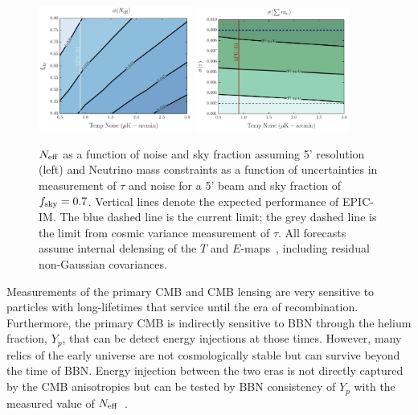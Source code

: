 \begin{figure}[t!]
\begin{center}
\includegraphics[width=0.45\textwidth]{figs/Neff.pdf}
\includegraphics[width=0.45\textwidth]{figs/Mnu_tauprior.pdf}
\caption{ \small \setlength{\baselineskip}{0.95\baselineskip}
${N_{\rm eff}}$ as a function of noise and sky fraction assuming 5' resolution (left) and
Neutrino mass constraints as a function of uncertainties in measurement of $\tau$ and noise for a 5' beam and 
sky fraction of $f_{\rm sky} = 0.7$. 
Vertical lines denote the expected performance of EPIC-IM. 
The blue dashed line is the current \planck limit; the grey dashed line is the limit from cosmic variance 
measurement of $\tau$. All forecasts assume internal delensing of the $T$ and $E$-maps~\cite{Green:2016cjr}, including residual non-Gaussian covariances.
\label{fig:Neff_future} }
\end{center}
\vspace{-0.15in}
\end{figure}

Measurements of the primary CMB and CMB lensing are very sensitive to particles with long-lifetimes that service 
until the era of recombination.  Furthermore, the primary CMB is indirectly sensitive to BBN through the helium fraction, $Y_p$, 
that can be detect energy injections at those times.  However, many relics of the early universe are not cosmologically stable but 
can survive beyond the time of BBN.  Energy injection between the two eras is not directly captured by the CMB anisotropies 
but can be tested by BBN consistency of $Y_p$ with the measured value of ${N_{\rm eff}}$~\cite{Fischler:2010xz,Baumann:2015rya}.  


